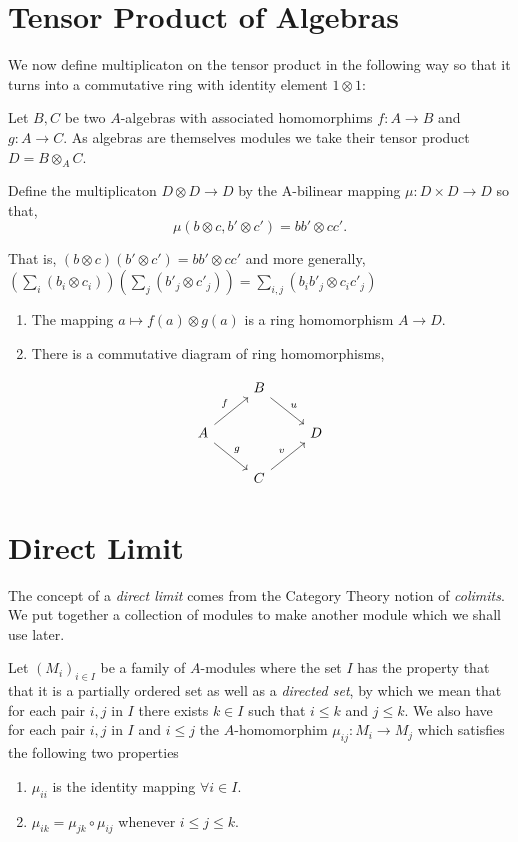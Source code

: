 \documentclass[]{report}
\begin{document}
\section{Tensor Product of Algebras}

We now define multiplicaton on the tensor product in the following way so that it turns into a commutative ring with identity element $1\otimes 1$:

Let $B,C$ be two $A$-algebras with associated homomorphims $f:A\rightarrow B$ and $g:A\rightarrow C$. As algebras are themselves modules we take their tensor product $D = B\otimes_A C$. 

Define the multiplicaton $D\otimes D \rightarrow D$ by the A-bilinear mapping $\mu: D\times D \rightarrow D$ so that,
$$\mu(b\otimes c, b'\otimes c') = bb' \otimes cc'. $$


That is, $(b\otimes c)(b'\otimes c') = bb'\otimes cc'$ and more generally, $(\sum_i(b_i\otimes c_i))(\sum_j(b'_j\otimes c'_j)) = \sum_{i,j}(b_i b'_j \otimes c_i c'_j)$
\begin{enumerate}
    \item The mapping $a\mapsto f(a)\otimes g(a)$ is a ring homomorphism $A\rightarrow D$. 
    \item There is a commutative diagram of ring homomorphisms, 
\end{enumerate}

\begin{equation*}
    \begin{tikzcd}
                                  & B \arrow[rd, "u"] &   \\
        A \arrow[ru, "f"] \arrow[rd, "g"] &                   & D \\
                                  & C \arrow[ru, "v"] &  
    \end{tikzcd}
\end{equation*}


\section{Direct Limit}

The concept of a \textit{direct limit} comes from the Category Theory notion of \textit{colimits}. We put together a collection of modules to make another module which we shall use later.

Let $(M_i)_{i\in I}$ be a family of $A$-modules where the set $I$ has the property that that it is a partially ordered set as well as a \textit{directed set}, by which we mean that for each pair $i,j$ in $I$ there exists $k\in I$ such that $i\leq k$ and $j\leq k$. We also have for each pair $i,j$ in $I$ and $i\leq j$ the $A$-homomorphim $\mu_{ij}: M_i \rightarrow M_j$ which satisfies the following two properties
\begin{enumerate}
    \item $\mu_{ii}$ is the identity mapping $\forall i\in I$.
    \item $\mu_{ik} = \mu_{jk}\circ \mu_{ij}$ whenever $i\leq j\leq k$.
\end{enumerate}
\end{document}
